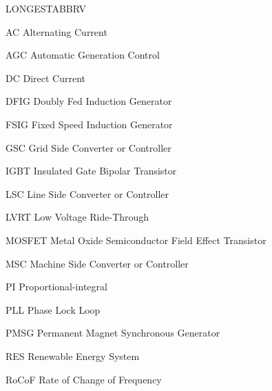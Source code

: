 \begin{theglossary}{LONGESTABBRV}

\item[AC] Alternating Current
\item[AGC] Automatic Generation Control
\item[DC] Direct Current
\item[DFIG] Doubly Fed Induction Generator
\item[FSIG] Fixed Speed Induction Generator
\item[GSC] Grid Side Converter or Controller
\item[IGBT] Insulated Gate Bipolar Transistor
\item[LSC] Line Side Converter or Controller
\item[LVRT] Low Voltage Ride-Through
\item[MOSFET] Metal Oxide Semiconductor Field Effect Transistor
\item[MSC] Machine Side Converter or Controller
\item[PI] Proportional-integral
\item[PLL] Phase Lock Loop
\item[PMSG] Permanent Magnet Synchronous Generator
\item[RES] Renewable Energy System
\item[RoCoF] Rate of Change of Frequency

\end{theglossary}
